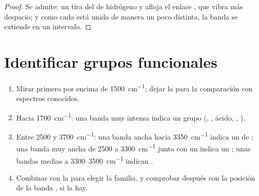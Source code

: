 \begin{proof}
Se admite: un  tira del  de hidrógeno y afloja
el enlace , que vibra más despacio; y como cada  está
unida de manera un poco distinta, la banda se extiende en un intervalo.
\end{proof}

\section{Identificar grupos funcionales}


\begin{method}\label{met:g11:infrared:reading}
\begin{enumerate}
  \item Mirar primero por encima de \qty{1500}{cm^{-1}}; dejar la  para la comparación con espectros
        conocidos.
  \item Hacia \qty{1700}{cm^{-1}}: una banda muy intensa indica un grupo
         (, , ácido, , ).
  \item Entre 2500 y \qty{3700}{cm^{-1}}: una banda ancha hacia
        \qty{3350}{cm^{-1}} indica un  de ; una banda muy
        ancha de 2500 a \qty{3300}{cm^{-1}} junto con un  indica
        un ; unas bandas medias a
        3300--\qty{3500}{cm^{-1}} indican .
  \item Combinar con la  para elegir la familia, y
        comprobar después con la posición de la banda , si la
        hay.
\end{enumerate}
\end{method}

